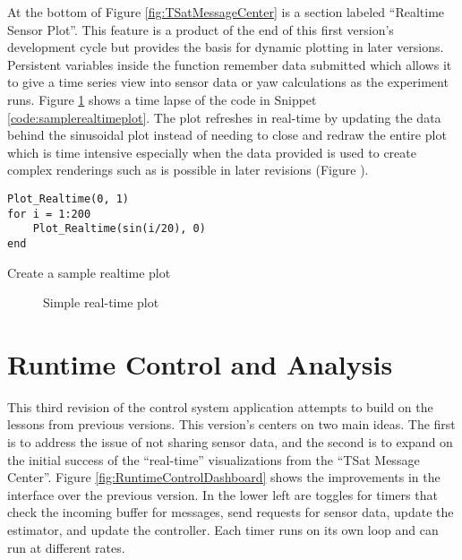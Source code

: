At the bottom of Figure \ref{fig:TSatMessageCenter} is a section labeled ``Realtime Sensor Plot''.  This feature is a product of the end of this first version's development cycle but provides the basis for dynamic plotting in later versions.  Persistent variables inside the function remember data submitted which allows it to give a time series view into sensor data or yaw calculations as the experiment runs.  Figure \ref{fig:SimpleRealtime} shows a time lapse of the code in Snippet \ref{code:samplerealtimeplot}.  The plot refreshes in real-time by updating the data behind the sinusoidal plot instead of needing to close and redraw the entire plot which is time intensive especially when the data provided is used to create complex renderings such as is possible in later revisions (Figure \label{fig:RuntimeSatelliteVisualization}).

\begin{listing}[H]
\begin{singlespace}
  \begin{verbatim}
Plot_Realtime(0, 1)
for i = 1:200
    Plot_Realtime(sin(i/20), 0)
end
  \end{verbatim}
\caption{Create a sample realtime plot}
\label{code:samplerealtimeplot}
\nocite{minted}
\end{singlespace}
\end{listing}
\begin{figure}[ht]
  \centerline{}
  \caption{Simple real-time plot}
  \label{fig:SimpleRealtime}
\end{figure}

\section{Runtime Control and Analysis}
\label{sec:RuntimeControlandAnalysis}

This third revision of the control system application attempts to build on the lessons from previous versions.  This version's centers on two main ideas.  The first is to address the issue of not sharing sensor data, and the second is to expand on the initial success of the ``real-time'' visualizations from the ``TSat Message Center''.  Figure \ref{fig:RuntimeControlDashboard} shows the improvements in the interface over the previous version.  In the lower left are toggles for timers that check the incoming buffer for messages, send requests for sensor data, update the estimator, and update the controller.  Each timer runs on its own loop and can run at different rates.

